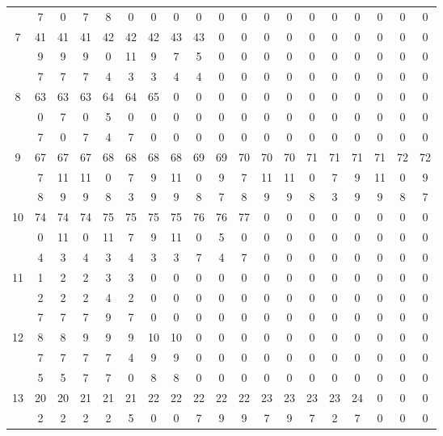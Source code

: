 \documentclass[letterpaper,12pt]{book}
\theoremstyle{definition} \newtheorem{Def}{Definición}[chapter]
\theoremstyle{definition} \newtheorem{Teo}{Teorema}[chapter]
\theoremstyle{definition} \newtheorem{Pro}{Proposición}[chapter]
\theoremstyle{definition} \newtheorem{Lema}{Lema}[chapter]
\begin{document}
\begin{table}[h]
{\begin{tabular}{ c c c c c c c c c c c c c c c c c c c}
 & 7 & 0 & 7 & 8 & 0 & 0 & 0 & 0 & 0 & 0 & 0 & 0 & 0 & 0 & 0 & 0 & 0 & 0 \\  %
7 & 41 & 41 & 41 & 42 & 42 & 42 & 43 & 43 & 0 & 0 & 0 & 0 & 0 & 0 & 0 & 0 & 0 & 0 \\  %
 & 9 & 9 & 9 & 0 & 11 & 9 & 7 & 5 & 0 & 0 & 0 & 0 & 0 & 0 & 0 & 0 & 0 & 0 \\  %
 & 7 & 7 & 7 & 4 & 3 & 3 & 4 & 4 & 0 & 0 & 0 & 0 & 0 & 0 & 0 & 0 & 0 & 0 \\  %
8 & 63 & 63 & 63 & 64 & 64 & 65 & 0 & 0 & 0 & 0 & 0 & 0 & 0 & 0 & 0 & 0 & 0 & 0 \\  %
 & 0 & 7 & 0 & 5 & 0 & 0 & 0 & 0 & 0 & 0 & 0 & 0 & 0 & 0 & 0 & 0 & 0 & 0 \\  %
 & 7 & 0 & 7 & 4 & 7 & 0 & 0 & 0 & 0 & 0 & 0 & 0 & 0 & 0 & 0 & 0 & 0 & 0 \\  %
9 & 67 & 67& 67 & 68 & 68 & 68 & 68 & 69 & 69 & 70 & 70 & 70 & 71 & 71 & 71 & 71 & 72 & 72 \\ %
 & 7 & 11 & 11 & 0 & 7 & 9 & 11 & 0 & 9 & 7 & 11 & 11 & 0 & 7 & 9 & 11 & 0 & 9 \\ %
 & 8 & 9 & 9 & 8 & 3 & 9 & 9 & 8 & 7 & 8 & 9 & 9 & 8 & 3 & 9 & 9 & 8 & 7 \\  %
10 & 74 & 74 & 74 & 75 & 75 & 75 & 75 & 76 & 76 & 77 & 0 & 0 & 0 & 0 & 0 & 0 & 0 & 0 \\ %
 & 0 & 11 & 0 & 11 & 7 & 9 & 11 & 0 & 5 & 0 & 0 & 0 & 0 & 0 & 0 & 0 & 0 & 0 \\ %
 & 4 & 3 & 4 & 3 & 4 & 3 & 3 & 7 & 4 & 7 & 0 & 0 & 0 & 0 & 0 & 0 & 0 & 0 \\ %
11 & 1 & 2 & 2 & 3 & 3 & 0 & 0 & 0 & 0 & 0 & 0 & 0 & 0 & 0 & 0 & 0 & 0 & 0 \\ %
 & 2 & 2 & 2 & 4 & 2 & 0 & 0 & 0 & 0 & 0 & 0 & 0 & 0 & 0 & 0 & 0 & 0 & 0 \\  %
 & 7 & 7 & 7 & 9 & 7 & 0 & 0 & 0 & 0 & 0 & 0 & 0 & 0 & 0 & 0 & 0 & 0 & 0 \\  %
12 & 8 & 8 & 9 & 9 & 9 & 10 & 10 & 0 & 0 & 0 & 0 & 0 & 0 & 0 & 0 & 0 & 0 & 0 \\ %
 & 7 & 7 & 7 & 7 & 4 & 9 & 9 & 0 & 0 & 0 & 0 & 0 & 0 & 0 & 0 & 0 & 0 & 0 \\ %
 & 5 & 5 & 7 & 7 & 0 & 8 & 8 & 0 & 0 & 0 & 0 & 0 & 0 & 0 & 0 & 0 & 0 & 0 \\ %
13 & 20 & 20 & 21 & 21 & 21& 22 & 22 & 22 & 22 & 22 & 23 & 23 & 23 & 23 & 24 & 0 & 0 & 0 \\ %
 & 2 & 2 & 2 & 2 & 5 & 0 & 0 & 7 & 9 & 9 & 7 & 9 & 7 & 2 & 7 & 0 & 0 & 0 \\ %

\end{tabular}}
\end{table}
\end{document}
